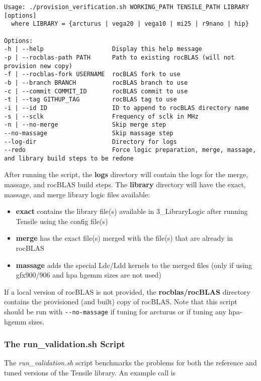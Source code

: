 \documentclass[]{article}
\begin{document}
\begin{lstlisting}
Usage: ./provision_verification.sh WORKING_PATH TENSILE_PATH LIBRARY [options]
  where LIBRARY = {arcturus | vega20 | vega10 | mi25 | r9nano | hip}

Options:
-h | --help                   Display this help message
-p | --rocblas-path PATH      Path to existing rocBLAS (will not provision new copy)
-f | --rocblas-fork USERNAME  rocBLAS fork to use
-b | --branch BRANCH          rocBLAS branch to use
-c | --commit COMMIT_ID       rocBLAS commit to use
-t | --tag GITHUP_TAG         rocBLAS tag to use
-i | --id ID                  ID to append to rocBLAS directory name
-s | --sclk                   Frequency of sclk in MHz
-n | --no-merge               Skip merge step
--no-massage                  Skip massage step
--log-dir                     Directory for logs
--redo                        Force logic preparation, merge, massage, and library build steps to be redone
\end{lstlisting}

After running the script, the \textbf{logs} directory will contain the logs for the merge, massage, and rocBLAS build steps. The \textbf{library} directory will have the exact, massage, and merge library logic files available:

\begin{itemize}
	\item \textbf{exact} contains the library file(s) available in 3\_LibraryLogic after running Tensile using the config file(s)
	\item \textbf{merge} has the exact file(s) merged with the file(s) that are already in rocBLAS
	\item \textbf{massage} adds the special Ldc/Ldd kernels to the merged files (only if using gfx900/906 and hpa hgemm sizes are not used)
\end{itemize}

\noindent
If a local version of rocBLAS is not provided, the \textbf{rocblas/rocBLAS} directory contains the provisioned (and built) copy of rocBLAS. Note that this script should be run with \lstinline{--no-massage} if tuning for arcturus or if tuning any hpa-hgemm sizes.

\subsubsection{The run\_validation.sh Script}

The \emph{run\_validation.sh} script benchmarks the problems for both the reference and tuned versions of the Tensile library. An example call is
\end{document}
